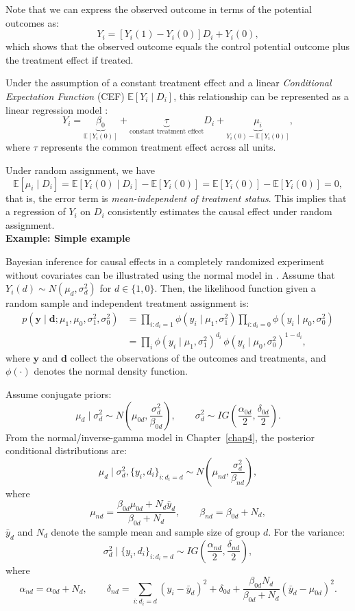 Note that we can express the observed outcome in terms of the potential outcomes as:
\[
Y_i = [Y_i(1) - Y_i(0)] D_i + Y_i(0),
\]
which shows that the observed outcome equals the control potential outcome plus the treatment effect if treated.

Under the assumption of a constant treatment effect and a linear \textit{Conditional Expectation Function} (CEF) $\mathbb{E}[Y_i\mid D_i]$, this relationship can be represented as a linear regression model \cite{angrist2009mostly}:
\[
Y_i = \underbrace{\beta_0}_{\mathbb{E}[Y_i(0)]} 
+ \underbrace{\tau}_{\text{constant treatment effect}} D_i 
+ \underbrace{\mu_i}_{Y_i(0) - \mathbb{E}[Y_i(0)]},
\]
where $\tau$ represents the common treatment effect across all units.

Under random assignment, we have
\begin{equation*}
	\mathbb{E}[\mu_i \mid D_i] = \mathbb{E}[Y_i(0) \mid D_i] - \mathbb{E}[Y_i(0)] = \mathbb{E}[Y_i(0)] - \mathbb{E}[Y_i(0)] = 0,
\end{equation*}
that is, the error term is \textit{mean-independent of treatment status}. This implies that a regression of $Y_i$ on $D_i$ consistently estimates the causal effect under random assignment.\\

\textbf{Example: Simple example}

Bayesian inference for causal effects in a completely randomized experiment without covariates can be illustrated using the normal model in \cite{rubin1990neyman}. Assume that $Y_i(d) \sim N(\mu_d, \sigma_d^2)$ for $d \in \{1,0\}$. Then, the likelihood function given a random sample and independent treatment assignment is:
\begin{align*}
	p(\mathbf{y} \mid \mathbf{d}; \mu_1,\mu_0,\sigma^2_1,\sigma^2_0)
	&= \prod_{i:d_i=1}\phi(y_i \mid \mu_1,\sigma_1^2) \prod_{i:d_i=0}\phi(y_i \mid \mu_0,\sigma_0^2) \\
	&= \prod_{i}\phi(y_i \mid \mu_1,\sigma_1^2)^{d_i} \, \phi(y_i \mid \mu_0,\sigma_0^2)^{1-d_i},
\end{align*}
where $\mathbf{y}$ and $\mathbf{d}$ collect the observations of the outcomes and treatments, and $\phi(\cdot)$ denotes the normal density function.

Assume conjugate priors: 
\[
\mu_d \mid \sigma^2_d \sim N\left(\mu_{0d}, \frac{\sigma^2_d}{\beta_{0d}}\right), 
\qquad 
\sigma^2_d \sim IG\left(\frac{\alpha_{0d}}{2}, \frac{\delta_{0d}}{2}\right).
\]
From the normal/inverse-gamma model in Chapter~\ref{chap4}, the posterior conditional distributions are:
\[
\mu_d \mid \sigma^2_d, \{y_i,d_i\}_{i:d_i=d} \sim N \left(\mu_{nd}, \frac{\sigma^2_d}{\beta_{nd}}\right), 
\]
where
\[
\mu_{nd} = \frac{\beta_{0d}\mu_{0d} + N_d \bar{y}_d}{\beta_{0d} + N_d}, 
\qquad 
\beta_{nd} = \beta_{0d} + N_d,
\]
$\bar{y}_d$ and $N_d$ denote the sample mean and sample size of group $d$. For the variance:
\[
\sigma^2_d \mid \{y_i,d_i\}_{i:d_i=d} \sim IG\left(\frac{\alpha_{nd}}{2}, \frac{\delta_{nd}}{2}\right),
\]
where
\[
\alpha_{nd} = \alpha_{0d} + N_d,
\qquad 
\delta_{nd} = \sum_{i:d_i=d} (y_i-\bar{y}_d)^2 + \delta_{0d} + \frac{\beta_{0d}N_d}{\beta_{0d}+N_d}(\bar{y}_d-\mu_{0d})^2.
\]

